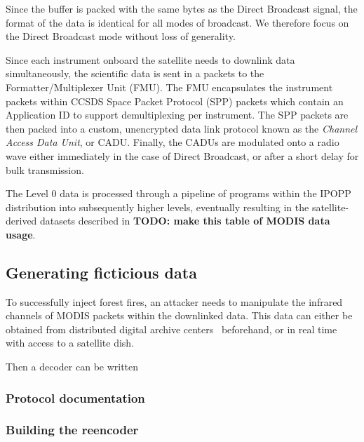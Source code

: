 Since the buffer is packed with the same bytes as the Direct Broadcast signal, the format of the data is identical for all modes of broadcast.
We therefore focus on the Direct Broadcast mode without loss of generality.


Since each instrument onboard the satellite needs to downlink data simultaneously, the scientific data is sent in a packets to the Formatter/Multiplexer Unit (FMU).
The FMU encapsulates the instrument packets within CCSDS Space Packet Protocol (SPP) packets which contain an Application ID to support demultiplexing per instrument.
The SPP packets are then packed into a custom, unencrypted data link protocol known as the \textit{Channel Access Data Unit}, or CADU.
Finally, the CADUs are modulated onto a radio wave either immediately in the case of Direct Broadcast, or after a short delay for bulk transmission.

The Level 0 data is processed through a pipeline of programs within the IPOPP distribution into subsequently higher levels, eventually resulting in the satellite-derived datasets described in \textbf{TODO: make this table of MODIS data usage}.

\subsection{Generating ficticious data}

To successfully inject forest fires, an attacker needs to manipulate the infrared channels of MODIS packets within the downlinked data.
This data can either be obtained from distributed digital archive centers~\cite{ladsweb} beforehand, or in real time with access to a satellite dish.

Then a decoder can be written


\subsubsection{Protocol documentation}

\subsubsection{Building the reencoder}

